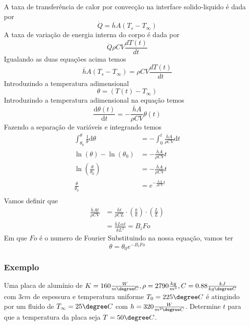 A taxa de transferência de calor por convecção na interface solido-liquido é dada por
\begin{equation}
    \dot{Q} = \overline{h} A (T_{s} - T_{\infty} )
\end{equation}
A taxa de variação de energia interna do corpo é dada por
\begin{equation}
    \dot{Q}  \rho C V \frac{dT(t)}{dt}
\end{equation}
Igualando as duas equações acima temos
\begin{equation}
    \overline{h} A (T_{s} - T_{\infty} ) = \rho C V \frac{dT(t)}{dt}
\end{equation}
Introduzindo a temperatura adimensional
\begin{equation}
    \theta = \left( T(t) - T_\infty  \right) 
\end{equation}
Introduzindo a temperatura adimensional na equação temos
\begin{equation}
    \frac{\mathrm{d}\theta (t)}{\mathrm{d}t} = -\frac{\overline{h} A}{\rho  C V}\theta (t) 
\end{equation}
Fazendo a separação de variáveis e integrando temos
\begin{align}
    \int_{\theta _{0} }^{\theta} \frac{1}{\theta} \mathrm{d}\theta &= -\int_{0}^{t} \frac{\overline{h} A}{\rho  C V} \mathrm{d}t\\
    \ln{(\theta)} - \ln{(\theta_{0})} &= -\frac{\overline{h} A}{\rho  C V} t\\
    \ln{\left( \frac{\theta}{\theta_{0}} \right) } &= -\frac{\overline{h} A}{\rho  C V} t\\
    \frac{\theta}{\theta_{0}} &= e^{-\frac{\overline{h} A}{\rho  C V} t}\\
\end{align}
Vamos definir que
\begin{align}
    \frac{\overline{h} At}{\rho  C V} &= \frac{\overline{h} t}{\rho C L} \cdot \left( \frac{k}{k} \right) \cdot \left( \frac{L}{L} \right) \\ 
    &= \frac{\overline{h} L \alpha t}{kL^{2} } = B_{i} Fo
\end{align}
Em que \(Fo\) é o numero de Fourier Substituindo na nossa equação, vamos ter
\begin{equation}\label{eq:capacitancia global}
    \theta = \theta_0 e^{-B_{i} Fo}
\end{equation}
\subsubsection{Exemplo}
Uma placa de alumínio de \(K = 160 \frac{W}{m \degree C}, \rho = 2790 \frac{kg}{m^{3} } , C = 0.88
\frac{kJ}{kg \degree C} \) com \(3 cm\) de espessura e temperatura uniforme \(T_0 = 225 \degree C\) é
atingindo por um fluido de \(T_\infty = 25 \degree C\) com \(h = 320 \frac{W}{m^2 \degree C}\).
Determine \(t\) para que a temperatura da placa seja \(T = 50 \degree C\). \par

